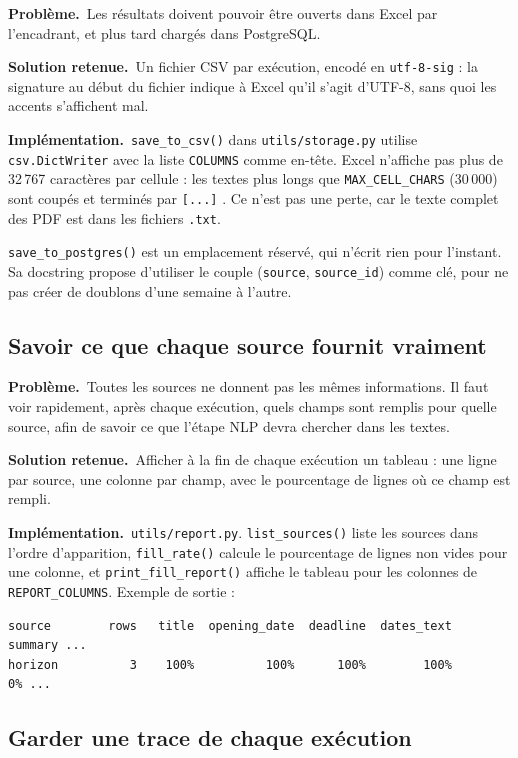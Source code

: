 \documentclass[11pt,a4paper]{article}
\newcommand{\pb}{\par\medskip\noindent\textbf{\textcolor{pbcolor}{Problème.}}\ }
\newcommand{\sol}{\par\medskip\noindent\textbf{\textcolor{solcolor}{Solution retenue.}}\ }
\newcommand{\impl}{\par\medskip\noindent\textbf{\textcolor{implcolor}{Implémentation.}}\ }
\newcommand{\code}[1]{\texttt{#1}}
\begin{document}
\pb Les résultats doivent pouvoir être ouverts dans Excel par l'encadrant, et plus tard
chargés dans PostgreSQL.

\sol Un fichier CSV par exécution, encodé en \code{utf-8-sig} : la signature au début du
fichier indique à Excel qu'il s'agit d'UTF-8, sans quoi les accents s'affichent mal.

\impl \code{save\_to\_csv()} dans \code{utils/storage.py} utilise \code{csv.DictWriter}
avec la liste \code{COLUMNS} comme en-tête. Excel n'affiche pas plus de 32\,767 caractères
par cellule : les textes plus longs que \code{MAX\_CELL\_CHARS} (30\,000) sont coupés et
terminés par \og \code{[...]} \fg. Ce n'est pas une perte, car le texte complet des PDF est
dans les fichiers \code{.txt}.

\code{save\_to\_postgres()} est un emplacement réservé, qui n'écrit rien pour l'instant. Sa
docstring propose d'utiliser le couple (\code{source}, \code{source\_id}) comme clé, pour ne
pas créer de doublons d'une semaine à l'autre.

\subsection{Savoir ce que chaque source fournit vraiment}

\pb Toutes les sources ne donnent pas les mêmes informations. Il faut voir rapidement,
après chaque exécution, quels champs sont remplis pour quelle source, afin de savoir ce
que l'étape NLP devra chercher dans les textes.

\sol Afficher à la fin de chaque exécution un tableau : une ligne par source, une colonne
par champ, avec le pourcentage de lignes où ce champ est rempli.

\impl \code{utils/report.py}. \code{list\_sources()} liste les sources dans l'ordre
d'apparition, \code{fill\_rate()} calcule le pourcentage de lignes non vides pour une
colonne, et \code{print\_fill\_report()} affiche le tableau pour les colonnes de
\code{REPORT\_COLUMNS}. Exemple de sortie :

\begin{lstlisting}[language={}]
source        rows   title  opening_date  deadline  dates_text  summary ...
horizon          3    100%          100%      100%        100%       0% ...
\end{lstlisting}

\subsection{Garder une trace de chaque exécution}
\end{document}
